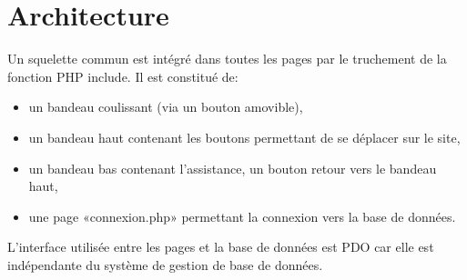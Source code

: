 \documentclass[12pt]{report}
\begin{document}
        \chapter{Architecture}
        \par             
	    Un squelette commun est intégré dans toutes les pages par le truchement de la fonction PHP include. Il  est constitué de:
	    \begin{itemize}
        \item{un bandeau coulissant (via un bouton amovible),}
        \item{un bandeau haut contenant les boutons permettant de se déplacer sur le site,}
        \item{ un bandeau bas contenant l’assistance, un bouton retour vers le bandeau haut,}
        \item{une page «connexion.php» permettant la connexion vers la base de données.}
        \end{itemize}
       L’interface utilisée entre les pages et la base de données est PDO car elle est indépendante du système de gestion de base de données.   
        \bigskip
       
\end{document}
